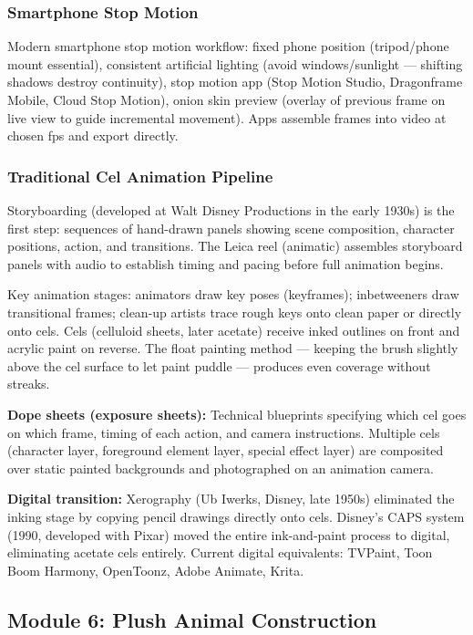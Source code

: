 \documentclass[11pt,letterpaper]{article}
\begin{document}
\subsubsection{Smartphone Stop Motion}

Modern smartphone stop motion workflow: fixed phone position (tripod/phone mount essential), consistent artificial lighting (avoid windows/sunlight --- shifting shadows destroy continuity), stop motion app (Stop Motion Studio, Dragonframe Mobile, Cloud Stop Motion), onion skin preview (overlay of previous frame on live view to guide incremental movement). Apps assemble frames into video at chosen fps and export directly.

\subsubsection{Traditional Cel Animation Pipeline}

Storyboarding (developed at Walt Disney Productions in the early 1930s) is the first step: sequences of hand-drawn panels showing scene composition, character positions, action, and transitions. The Leica reel (animatic) assembles storyboard panels with audio to establish timing and pacing before full animation begins.

Key animation stages: animators draw key poses (keyframes); inbetweeners draw transitional frames; clean-up artists trace rough keys onto clean paper or directly onto cels. Cels (celluloid sheets, later acetate) receive inked outlines on front and acrylic paint on reverse. The float painting method --- keeping the brush slightly above the cel surface to let paint puddle --- produces even coverage without streaks.

\textbf{Dope sheets (exposure sheets):} Technical blueprints specifying which cel goes on which frame, timing of each action, and camera instructions. Multiple cels (character layer, foreground element layer, special effect layer) are composited over static painted backgrounds and photographed on an animation camera.

\textbf{Digital transition:} Xerography (Ub Iwerks, Disney, late 1950s) eliminated the inking stage by copying pencil drawings directly onto cels. Disney's CAPS system (1990, developed with Pixar) moved the entire ink-and-paint process to digital, eliminating acetate cels entirely. Current digital equivalents: TVPaint, Toon Boom Harmony, OpenToonz, Adobe Animate, Krita.

\subsection{Module 6: Plush Animal Construction}
\end{document}
